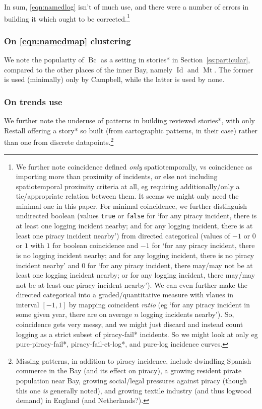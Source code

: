 \documentclass{amsart}
\newcommand{\code}{\texttt} %
\newcommand{\ment}{\textit} %
\DeclareMathOperator{\id}{Id} %
\DeclareMathOperator{\mt}{Mt} %
\DeclareMathOperator{\bc}{Bc} %
\theoremstyle{definition}
\theoremstyle{remark}
\begin{document}
		In sum, \ref{eqn:namedlog} isn't of much use, and there were a number of errors in building it which ought to be corrected.\footnote{We further note coincidence defined \emph{only} spatiotemporally, vs coincidence as importing more than proximity of incidents, or else not including spatiotemporal proximity criteria at all, eg requiring additionally/only a tie/appropriate relation between them. It seems we might only need the minimal one in this paper. For minimal coincidence, we further distinguish undirected boolean (values \code{true} or \code{false} for `for any piracy incident, there is at least one logging incident nearby; and for any logging incident, there is at least one piracy incident nearby') from directed categorical (values of \(-1\) or \(0\) or \(1\) with \(1\) for boolean coincidence and \(-1\) for `for any piracy incident, there is no logging incident nearby; and for any logging incident, there is no piracy incident nearby' and \(0\) for `for any piracy incident, there may/may not be at least one logging incident nearby; or for any logging incident, there may/may not be at least one piracy incident nearby'). We can even further make the directed categorical into a graded/quantitative measure with vlaues in interval \([-1,1]\) by mapping coincident \ment{ratio} (eg `for any piracy incident in some given year, there are on average \(n\) logging incidents nearby'). So, coincidence gets very messy, and we might just discard and instead count logging as a strict subset of piracy-fail* incidents. So we might look at only eg pure-piracy-fail*, piracy-fail-et-log*, and pure-log incidence curves.} %
		\subsubsection{On \ref{eqn:namedmap} clustering}
		\label{sss:onmapclusters}
		We note the popularity of \(\bc\) as a setting in stories* in Section~\ref{ss:particular}, compared to the other places of the inner Bay, namely \(\id\) and \(\mt\). The former is used (minimally) only by Campbell, while the latter is used by none.
		\subsubsection{On trends use}
		\label{sss:ontrendsuse}
		We further note the underuse of patterns in building reviewed stories*, with only Restall offering a story* so built (from cartographic patterns, in their case) rather than one from discrete datapoints.\footnote{Missing patterns, in addition to piracy incidence, include dwindling Spanish commerce in the Bay (and its effect on piracy), a growing resident pirate population near Bay, growing social/legal pressures against piracy (though this one \emph{is} generally noted), and growing textile industry (and thus logwood demand) in England (and Netherlands?).}
\end{document}
